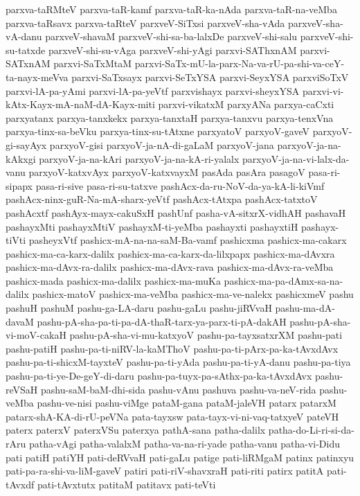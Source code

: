 {parxva-taRMteV
parxva-taR-kamf
parxva-taR-ka-nAda
parxva-taR-na-veMba
parxva-taRsavx
parxva-taRteV
parxveV-SiTxsi
parxveV-sha-vAda
parxveV-sha-vA-danu
parxveV-shavaM
parxveV-shi-sa-ba-lalxDe
parxveV-shi-salu
parxveV-shi-su-tatxde
parxveV-shi-su-vAga
parxveV-shi-yAgi
parxvi-SAThxnAM
parxvi-SATxnAM
parxvi-SaTxMtaM
parxvi-SaTx-mU-la-parx-Na-va-rU-pa-shi-va-ceY-ta-nayx-meVva
parxvi-SaTxsayx
parxvi-SeTxYSA
parxvi-SeyxYSA
parxviSoTxV
parxvi-lA-pa-yAmi
parxvi-lA-pa-yeVtf
parxvishayx
parxvi-sheyxYSA
parxvi-vi-kAtx-Kayx-mA-naM-dA-Kayx-miti
parxvi-vikatxM
parxyANa
parxya-caCxti
parxyatanx
parxya-tanxkekx
parxya-tanxtaH
parxya-tanxvu
parxya-tenxVna
parxya-tinx-sa-beVku
parxya-tinx-su-tAtxne
parxyatoV
parxyoV-gaveV
parxyoV-gi-sayAyx
parxyoV-gisi
parxyoV-ja-nA-di-gaLaM
parxyoV-jana
parxyoV-ja-na-kAkxgi
parxyoV-ja-na-kAri
parxyoV-ja-na-kA-ri-yalalx
parxyoV-ja-na-vi-lalx-da-vanu
parxyoV-katxvAyx
parxyoV-katxvayxM
pasAda
pasAra
pasagoV
pasa-ri-sipapx
pasa-ri-sive
pasa-ri-su-tatxve
pashAcx-da-ru-NoV-da-ya-kA-li-kiVmf
pashAcx-ninx-guR-Na-mA-sharx-yeVtf
pashAcx-tAtxpa
pashAcx-tatxtoV
pashAcxtf
pashAyx-mayx-cakuSxH
pashUnf
pasha-vA-sitxrX-vidhAH
pashavaH
pashayxMti
pashayxMtiV
pashayxM-ti-yeMba
pashayxti
pashayxtiH
pashayx-tiVti
pasheyxVtf
pashicx-mA-na-na-saM-Ba-vamf
pashicxma
pashicx-ma-cakarx
pashicx-ma-ca-karx-dalilx
pashicx-ma-ca-karx-da-lilxpapx
pashicx-ma-dAvxra
pashicx-ma-dAvx-ra-dalilx
pashicx-ma-dAvx-rava
pashicx-ma-dAvx-ra-veMba
pashicx-mada
pashicx-ma-dalilx
pashicx-ma-muKa
pashicx-ma-pa-dAmx-sa-na-dalilx
pashicx-matoV
pashicx-ma-veMba
pashicx-ma-ve-nalekx
pashicxmeV
pashu
pashuH
pashuM
pashu-ga-LA-daru
pashu-gaLu
pashu-jiRVvaH
pashu-ma-dA-davaM
pashu-pA-sha-pa-ti-pa-dA-thaR-tarx-ya-parx-ti-pA-dakAH
pashu-pA-sha-vi-moV-cakaH
pashu-pA-sha-vi-mu-katxyoV
pashu-pa-tayxsatxrXM
pashu-pati
pashu-patiH
pashu-pa-ti-niRV-la-kaMThoV
pashu-pa-ti-pArx-pa-ka-tAvxdAvx
pashu-pa-ti-shicxM-tayxteV
pashu-pa-ti-yAda
pashu-pa-ti-yA-danu
pashu-pa-tiya
pashu-pa-ti-ye-De-geY-di-daru
pashu-pa-tuyx-pa-sAthx-pa-ka-tAvxdAvx
pashu-reVSaH
pashu-saM-baM-dhi-sida
pashu-vAnu
pashuva
pashu-va-neV-rida
pashu-veMba
pashu-ve-nisi
pashu-viMge
pataM-gana
pataM-jaleVH
patarx
patarxM
patarx-shA-KA-di-rU-peVNa
pata-tayxsw
pata-tayx-vi-ni-vaq-tatxyeV
pateVH
paterx
paterxV
paterxVSu
paterxya
pathA-sana
patha-dalilx
patha-do-Li-ri-si-da-rAru
patha-vAgi
patha-valalxM
patha-va-na-ri-yade
patha-vanu
patha-vi-Didu
pati
patiH
patiYH
pati-deRVvaH
pati-gaLu
patige
pati-liRMgaM
patinx
patinxyu
pati-pa-ra-shi-va-liM-gaveV
patiri
pati-riV-shavxraH
pati-riti
patirx
patitA
pati-tAvxdf
pati-tAvxtutx
patitaM
patitavx
pati-teVti
}
